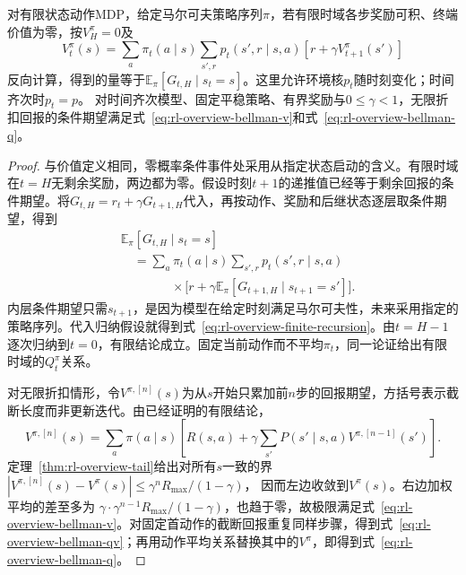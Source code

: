 \begin{theorem}[回报期望与递推一致]
  \label{thm:rl-overview-recursion}
  对有限状态动作MDP，给定马尔可夫策略序列$\pi$，若有限时域各步奖励可积、终端价值为零，按$V_H^\pi=0$及
  \begin{equation}
    V_t^\pi(s)=\sum_a\pi_t(a\mid s)\sum_{s',r}
      p_t(s',r\mid s,a)[r+\gamma V_{t+1}^\pi(s')]
    \label{eq:rl-overview-finite-recursion}
  \end{equation}
  反向计算，得到的量等于$\mathbb E_\pi[G_{t,H}\mid s_t=s]$。这里允许环境核$p_t$随时刻变化；时间齐次时$p_t=p$。
  对时间齐次模型、固定平稳策略、有界奖励与$0\leq\gamma<1$，无限折扣回报的条件期望满足式~\eqref{eq:rl-overview-bellman-v}和式~\eqref{eq:rl-overview-bellman-q}。
\end{theorem}

\begin{proof}
  与价值定义相同，零概率条件事件处采用从指定状态启动的含义。有限时域在$t=H$无剩余奖励，两边都为零。假设时刻$t+1$的递推值已经等于剩余回报的条件期望。将$G_{t,H}=r_t+\gamma G_{t+1,H}$代入，再按动作、奖励和后继状态逐层取条件期望，得到
  \[
  \begin{aligned}
   &\mathbb E_\pi[G_{t,H}\mid s_t=s]\\
   &\quad=\sum_a\pi_t(a\mid s)\sum_{s',r}p_t(s',r\mid s,a)\\
   &\qquad\qquad{}\times
      \bigl[r+\gamma\mathbb E_\pi[G_{t+1,H}\mid s_{t+1}=s']\bigr].
  \end{aligned}
  \]
  内层条件期望只需$s_{t+1}$，是因为模型在给定时刻满足马尔可夫性，未来采用指定的策略序列。代入归纳假设就得到式~\eqref{eq:rl-overview-finite-recursion}。由$t=H-1$逐次归纳到$t=0$，有限结论成立。固定当前动作而不平均$\pi_t$，同一论证给出有限时域的$Q_t^\pi$关系。

  对无限折扣情形，令$V^{\pi,[n]}(s)$为从$s$开始只累加前$n$步的回报期望，方括号表示截断长度而非更新迭代。由已经证明的有限结论，
  \[
    V^{\pi,[n]}(s)=\sum_a\pi(a\mid s)
       \left[R(s,a)+\gamma\sum_{s'}P(s'\mid s,a)
                                       V^{\pi,[n-1]}(s')\right].
  \]
  定理~\ref{thm:rl-overview-tail}给出对所有$s$一致的界
  $|V^{\pi,[n]}(s)-V^\pi(s)|\leq\gamma^nR_{\max}/(1-\gamma)$，
  因而左边收敛到$V^\pi(s)$。右边加权平均的差至多为
  $\gamma\cdot\gamma^{n-1}R_{\max}/(1-\gamma)$，也趋于零，故极限满足式~\eqref{eq:rl-overview-bellman-v}。对固定首动作的截断回报重复同样步骤，得到式~\eqref{eq:rl-overview-bellman-qv}；再用动作平均关系替换其中的$V^\pi$，即得到式~\eqref{eq:rl-overview-bellman-q}。
\end{proof}

